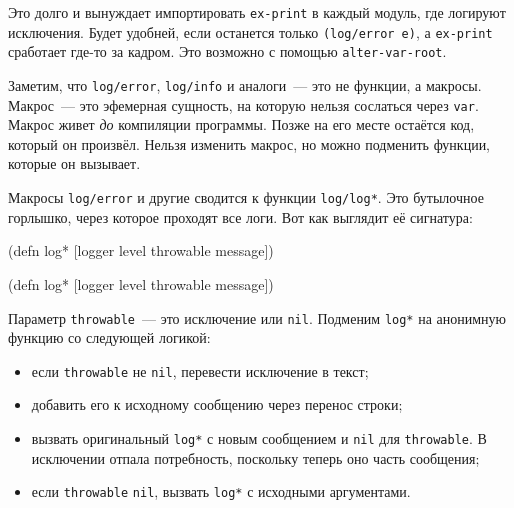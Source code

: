 Это долго и вынуждает импортировать \texttt{ex-\-print} в каждый модуль, где логируют
исключения. Будет удобней, если останется только \verb|(log/error e)|, а
\verb|ex-print| сработает где-то за кадром. Это возможно с помощью
\texttt{alter-var\--root}.

Заметим, что \verb|log/error|, \verb|log/info| и аналоги~--- это не функции, а
макросы. Макрос~--- это эфемерная сущность, на которую нельзя сослаться через
\verb|var|. Макрос живет \emph{до} компиляции программы. Позже на его месте
остаётся код, который он произвёл. Нельзя изменить макрос, но можно подменить
функции, которые он вызывает.


Макросы \verb|log/error| и другие сводится к функции \verb|log/log*|. Это
бутылочное горлышко, через которое проходят все логи. Вот как выглядит её
сигнатура:

\ifx\DEVICETYPE\MOBILE

\begin{english}
  \begin{clojure}
(defn log*
  [logger level throwable message])
  \end{clojure}
\end{english}

\else

\begin{english}
  \begin{clojure}
(defn log* [logger level throwable message])
  \end{clojure}
\end{english}

\fi

Параметр \verb|throwable|~--- это исключение или \verb|nil|. Подменим
\verb|log*| на анонимную функцию со следующей логикой:

\begin{itemize}

\item
  если \verb|throwable| не \verb|nil|, перевести исключение в текст;

\item
  добавить его к исходному сообщению через перенос строки;

\item
  вызвать оригинальный \verb|log*| с новым сообщением и \verb|nil| для
  \verb|throwable|. В исключении отпала потребность, поскольку теперь оно
  часть сообщения;

\item
  если \verb|throwable| \verb|nil|, вызвать \verb|log*| с исходными
  аргументами.

\end{itemize}


